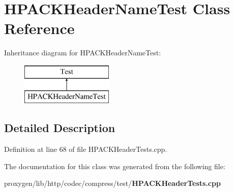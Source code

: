 \section{H\+P\+A\+C\+K\+Header\+Name\+Test Class Reference}
\label{classHPACKHeaderNameTest}
Inheritance diagram for H\+P\+A\+C\+K\+Header\+Name\+Test\+:\begin{figure}[H]
\begin{center}
\leavevmode
\includegraphics[height=2.000000cm]{classHPACKHeaderNameTest}
\end{center}
\end{figure}


\subsection{Detailed Description}


Definition at line 68 of file H\+P\+A\+C\+K\+Header\+Tests.\+cpp.



The documentation for this class was generated from the following file\+:\begin{DoxyCompactItemize}
\item 
proxygen/lib/http/codec/compress/test/{\bf H\+P\+A\+C\+K\+Header\+Tests.\+cpp}\end{DoxyCompactItemize}
